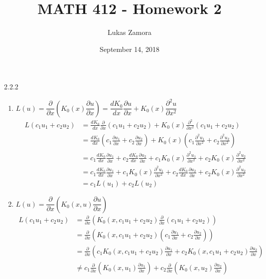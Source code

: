 \documentclass{article}
\title{MATH 412 - Homework 2}
\author{Lukas Zamora}
\date{September 14, 2018}
\theoremstyle{definition}
\begin{document}
    \maketitle
    
    \begin{prob}{2.2.2} $  $ \\
    	\begin{enumerate}[label=\alph*.)]
    		\item $ L(u) = \dfrac{\partial}{\partial x} \left( K_0(x) \dfrac{\partial u}{\partial x} \right) = \dfrac{dK_0}{dx} \dfrac{\partial u}{\partial x} + K_0(x) \dfrac{\partial^2 u}{\partial x^2} $
    		\begin{align*}
    			L(c_1 u_1 + c_2 u_2) &= \frac{dK_0}{dx} \frac{\partial}{\partial x} (c_1 u_1 + c_2 u_2) + K_0(x) \frac{\partial^2}{\partial x^2} (c_1 u_1 + c_2 u_2) \\
    			&= \frac{dK_0}{dx} \left( c_1 \frac{\partial u_1}{\partial x} + c_2 \frac{\partial u_2}{\partial x} \right) + K_0(x) \left( c_1 \frac{\partial^2 u_1}{\partial x^2} + c_2 \frac{\partial^2 u_2}{\partial x^2} \right) \\
    			&= c_1 \frac{dK_0}{dx} \frac{\partial u_1}{\partial x} + c_2 \frac{dK_0}{dx} \frac{\partial u_2}{\partial x} + c_1 K_0(x) \frac{\partial^2 u_1}{\partial x^2} + c_2 K_0(x) \frac{\partial^2 u_2}{\partial x^2} \\
    			&= c_1 \frac{dK_0}{dx} \frac{\partial u_1}{\partial x} + c_1 K_0(x) \frac{\partial^2 u_1}{\partial x^2} + c_2 \frac{dK_0}{dx} \frac{\partial u_2}{\partial x} + c_2 K_0(x) \frac{\partial^2 u_2}{\partial x^2} \\
    			&= c_1 L(u_1) + c_2 L(u_2)
    		\end{align*}
    		
    		\item $ L(u) = \dfrac{\partial}{\partial x} \left( K_0(x,u) \dfrac{\partial u}{\partial x} \right) $
    		\begin{align*}
    			L(c_1 u_1 + c_2 u_2) &= \frac{\partial}{\partial x} \left( K_0(x, c_1 u_1 + c_2 u_2) \frac{\partial}{\partial x}(c_1 u_1 + c_2 u_2) \right) \\
    			&= \frac{\partial}{\partial x} \left( K_0(x, c_1 u_1 + c_2 u_2) \left( c_1 \frac{\partial u_1}{\partial x} + c_2 \frac{\partial u_2}{\partial x} \right) \right) \\
    			&= \frac{\partial}{\partial x} \left( c_1 K_0(x, c_1 u_1 + c_2 u_2) \frac{\partial u_1}{\partial x} + c_2 K_0(x, c_1 u_1 + c_2 u_2) \frac{\partial u_2}{\partial x} \right) \\
    			&\neq c_1 \frac{\partial}{\partial x} \left( K_0(x,u_1) \frac{\partial u_1}{\partial x} \right) + c_2 \frac{\partial}{\partial x} \left( K_0(x,u_2) \frac{\partial u_2}{\partial x} \right)
    		\end{align*}
    	\end{enumerate}
    \end{prob}
\end{document}
